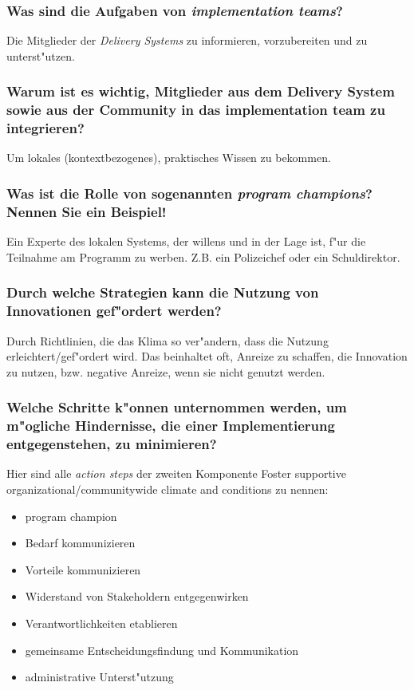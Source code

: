 \subsubsection{Was sind die Aufgaben von \emph{implementation teams}?}
Die Mitglieder der \emph{Delivery Systems} zu informieren, vorzubereiten und zu unterst"utzen.

\subsubsection{Warum ist es wichtig, Mitglieder aus dem Delivery System sowie aus der Community in das implementation team zu integrieren?}
Um lokales (kontextbezogenes), praktisches Wissen zu bekommen.

\subsubsection{Was ist die Rolle von sogenannten \emph{program champions}? Nennen Sie ein Beispiel!}
Ein Experte des lokalen Systems, der willens und in der Lage ist, f"ur die Teilnahme am Programm zu werben. Z.B. ein Polizeichef oder ein Schuldirektor.

\subsubsection{Durch welche Strategien kann die Nutzung von Innovationen gef"ordert werden?}
Durch Richtlinien, die das Klima so ver"andern, dass die Nutzung erleichtert/gef"ordert wird. Das beinhaltet oft, Anreize zu schaffen, die Innovation zu nutzen, bzw. negative Anreize, wenn sie nicht genutzt werden.

\subsubsection{Welche Schritte k"onnen unternommen werden, um m"ogliche Hindernisse, die einer Implementierung entgegenstehen, zu minimieren?}
Hier sind alle \emph{action steps} der zweiten Komponente {Foster supportive organizational/communitywide climate and conditions} zu nennen:
\begin{itemize}
        \item program champion
        \item Bedarf kommunizieren
        \item Vorteile kommunizieren
        \item Widerstand von Stakeholdern entgegenwirken
        \item Verantwortlichkeiten etablieren
        \item gemeinsame Entscheidungsfindung und Kommunikation 
        \item administrative Unterst"utzung
\end{itemize}
